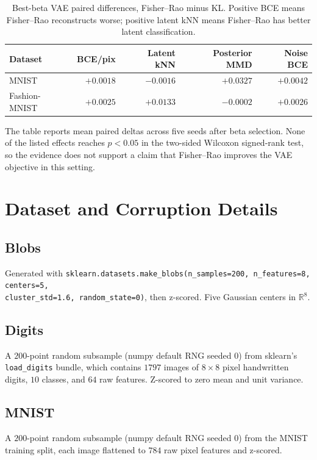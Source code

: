 \documentclass[11pt]{article}
\begin{document}
\begin{table}[h]
  \centering
  \caption{Best-beta VAE paired differences, Fisher--Rao minus KL. Positive BCE means
  Fisher--Rao reconstructs worse; positive latent kNN means Fisher--Rao has better latent
  classification.}
  \label{tab:vae}
  \scriptsize
  \begin{tabular}{lrrrr}
    \toprule
    Dataset & BCE/pix & Latent kNN & Posterior MMD & Noise BCE \\
    \midrule
    MNIST         & $+0.0018$ & $-0.0016$ & $+0.0327$ & $+0.0042$ \\
    Fashion-MNIST & $+0.0025$ & $+0.0133$ & $-0.0002$ & $+0.0026$ \\
    \bottomrule
  \end{tabular}
\end{table}

The table reports mean paired deltas across five seeds after beta selection. None of the
listed effects reaches $p<0.05$ in the two-sided Wilcoxon signed-rank test, so the evidence
does not support a claim that Fisher--Rao improves the VAE objective in this setting.

\section{Dataset and Corruption Details}
\label{app:datasets}

\subsection{Blobs}
Generated with \texttt{sklearn.datasets.make\_blobs(n\_samples=200, n\_features=8, centers=5,\\ cluster\_std=1.6, random\_state=0)}, then z-scored. Five Gaussian centers in $\mathbb{R}^8$.

\subsection{Digits}
A $200$-point random subsample (numpy default RNG seeded $0$) from sklearn's
\texttt{load\_digits} bundle, which contains $1797$ images of $8\times 8$ pixel handwritten
digits, $10$ classes, and $64$ raw features. Z-scored to zero mean and unit variance.

\subsection{MNIST}
A $200$-point random subsample (numpy default RNG seeded $0$) from the MNIST training split,
each image flattened to $784$ raw pixel features and z-scored.
\end{document}
